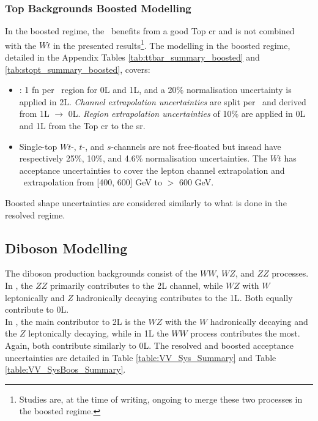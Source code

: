 \subsubsection{Top Backgrounds Boosted Modelling} 
In the boosted regime, the \ttb\ benefits from a good Top \gls{cr} and is not combined with the $Wt$ in the presented results\footnote{Studies are, at the time of writing, ongoing to merge these two processes in the boosted regime.}. The modelling in the boosted regime, detailed in the Appendix Tables \ref{tab:ttbar_summary_boosted} and \ref{tab:stopt_summary_boosted}, covers:
\begin{itemize}[leftmargin=*]
    \item \ttb: 1 \gls{fn} per \ptv\ region for 0L and 1L, and a 20\% normalisation uncertainty is applied in 2L. \textit{Channel extrapolation uncertainties} are split per \ptv\ and derived from 1L $\rightarrow$ 0L. \textit{Region extrapolation uncertainties} of 10\% are applied in 0L and 1L from the Top \gls{cr} to the \gls{sr}.
    \item Single-top $Wt$-, $t$-, and $s$-channels are not free-floated but insead have respectively 25\%, 10\%, and 4.6\% normalisation uncertainties. The $Wt$ has acceptance uncertainties to cover the lepton channel extrapolation and \ptv\ extrapolation from [400, 600] GeV to $>$ 600 GeV. 
\end{itemize}
Boosted shape uncertainties are considered similarly to what is done in the resolved regime.

\subsection{Diboson Modelling}
The diboson production backgrounds consist of the $WW$, $WZ$, and $ZZ$ processes. In \vhb, the $ZZ$ primarily contributes to the 2L channel, while $WZ$ with $W$ leptonically and $Z$ hadronically decaying contributes to the 1L. Both equally contribute to 0L. \\

In \vhc, the main contributor to 2L is the $WZ$ with the $W$ hadronically decaying and the $Z$ leptonically decaying, while in 1L the $WW$ process contributes the most. Again, both contribute similarly to 0L. The resolved and boosted acceptance uncertainties are detailed in Table \ref{table:VV_Sys_Summary} and Table \ref{table:VV_SysBoos_Summary}. \\

